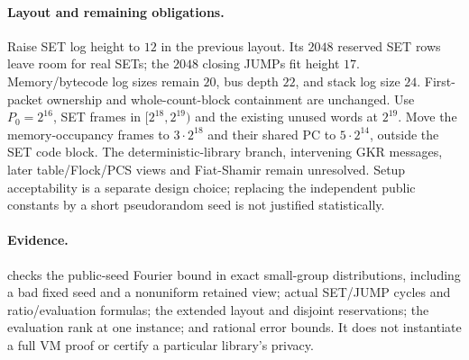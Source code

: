 \paragraph{Layout and remaining obligations.} Raise SET log height to $12$ in the previous layout. Its $2048$ reserved SET rows leave room for real SETs; the $2048$ closing JUMPs fit height $17$. Memory/bytecode log sizes remain $20$, bus depth $22$, and stack log size $24$. First-packet ownership and whole-count-block containment are unchanged. Use $P_0=2^{16}$, SET frames in $[2^{18},2^{19})$ and the existing unused words at $2^{19}$. Move the memory-occupancy frames to $3\cdot2^{18}$ and their shared PC to $5\cdot2^{14}$, outside the SET code block. The deterministic-library branch, intervening GKR messages, later table/Flock/PCS views and Fiat-Shamir remain unresolved. Setup acceptability is a separate design choice; replacing the independent public constants by a short pseudorandom seed is not justified statistically.

\paragraph{Evidence.}  checks the public-seed Fourier bound in exact small-group distributions, including a bad fixed seed and a nonuniform retained view; actual SET/JUMP cycles and ratio/evaluation formulas; the extended layout and disjoint reservations; the evaluation rank at one instance; and rational error bounds. It does not instantiate a full VM proof or certify a particular library's privacy.
